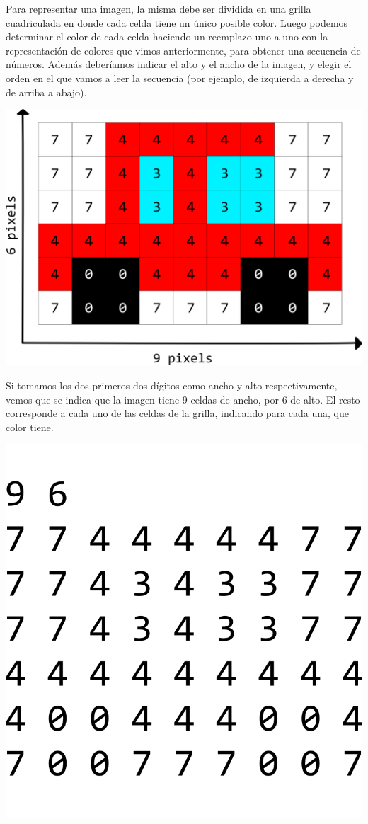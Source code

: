 Para representar una imagen, la misma debe ser dividida en una grilla
cuadriculada en donde cada celda tiene un único posible color. Luego podemos
determinar el color de cada celda haciendo un reemplazo uno a uno con la
representación de colores que vimos anteriormente, para obtener una secuencia
de números. Además deberíamos indicar el alto y el ancho de la imagen, y elegir
el orden en el que vamos a leer la secuencia (por ejemplo, de izquierda a
derecha y de arriba a abajo).

\centerline{\includegraphics[scale=0.75]{capitulos/bajo_nivel/imagenes/pixels_car_labeled.png}}

Si tomamos los dos primeros dos dígitos como ancho y alto respectivamente, vemos
que se indica que la imagen tiene 9 celdas de ancho, por 6 de alto. El resto
corresponde a cada uno de las celdas de la grilla, indicando para cada una, que
color tiene.

\centerline{\includegraphics[]{capitulos/bajo_nivel/imagenes/pixels_car_numbers.png}}

